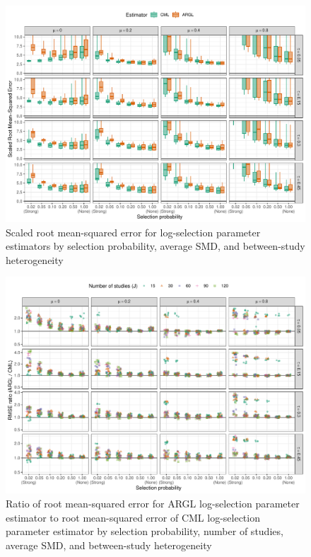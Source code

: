 \documentclass[
  american,
  man, donotrepeattitle,mask,floatsintext]{apa7}
\numberwithin{table}{section}
\numberwithin{equation}{section}
\numberwithin{figure}{section}
\begin{document}
\begin{figure}
\includegraphics{step-function-selection-models-supplementary-materials_files/figure-latex/selection-rmse-1} \caption{Scaled root mean-squared error for log-selection parameter estimators by selection probability, average SMD, and between-study heterogeneity}\label{fig:selection-rmse}
\end{figure}

\begin{figure}
\includegraphics{step-function-selection-models-supplementary-materials_files/figure-latex/selection-rmse-ARGL-CML-1} \caption{Ratio of root mean-squared error for ARGL log-selection parameter estimator to root mean-squared error of CML log-selection parameter estimator by selection probability, number of studies, average SMD, and between-study heterogeneity}\label{fig:selection-rmse-ARGL-CML}
\end{figure}
\end{document}
